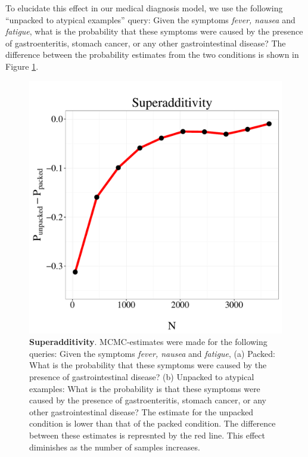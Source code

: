 To elucidate this effect in our medical diagnosis model, we use the following ``unpacked to atypical examples'' query: Given the symptoms \emph{fever, nausea} and \emph{fatigue}, what is the probability that these symptoms were caused by the presence of gastroenteritis, stomach cancer, or any other gastrointestinal disease? The difference between the probability estimates from the two conditions is shown in Figure \ref{fig:superadd}.

\begin{figure}
\centering
\includegraphics[scale = 0.5]{figures/super.pdf}
\caption{\textbf{Superadditivity}. MCMC-estimates were made for the following queries: Given the symptoms \emph{fever, nausea} and \emph{fatigue}, (a) Packed: What is the probability that these symptoms were caused by the presence of gastrointestinal disease? (b) Unpacked to atypical examples: What is the probability is that these symptoms were caused by the presence of gastroenteritis, stomach cancer, or any other gastrointestinal disease? The estimate for the unpacked condition is lower than that of the packed condition. The difference between these estimates is represnted by the red line. This effect diminishes as the number of samples increases.}
\label{fig:superadd}
\end{figure}

